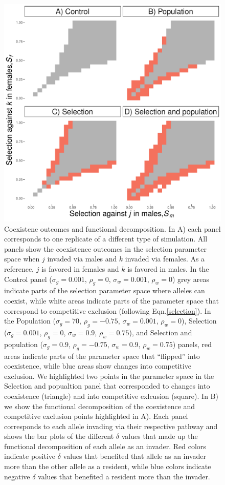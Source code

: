 \begin{figure}[H]
  \centerline{\includegraphics[width=1\textwidth]{outcomes.pdf}}
  \caption{  Coexistene outcomes and functional decomposition. In A) each panel corresponds to one replicate of a different type of simulation. All panels show the coexistence outcomes in the selection parameter space when $j$ invaded via males and $k$ invaded via females. As a reference, $j$ is favored in females and $k$ is favored in males. In the Control panel ($\sigma_{g}=0.001$, $\rho_{g}=0$, $\sigma_{w}=0.001$, $\rho_{w}=0$) grey areas indicate parts of the selection parameter space where alleles can coexist, while white areas indicate parts of the parameter space that correspond to competitive exclusion (following Eqn.\ref{selection}). In the Population ($\sigma_{g}=70$, $\rho_{g}=-0.75$, $\sigma_{w}=0.001$, $\rho_{w}=0$), Selection ($\sigma_{g}=0.001$, $\rho_{g}=0$, $\sigma_{w}=0.9$, $\rho_{w}=0.75$), and Selection and population ($\sigma_{g}=0.9$, $\rho_{g}=-0.75$, $\sigma_{w}=0.9$, $\rho_{w}=0.75$) panels, red areas indicate parts of the parameter space that ``flipped'' into coexistence, while  blue areas show changes into competitive exclusion. We highlighted two points in the parameter space in the Selection and popualtion panel that corresponded to changes into coexistence (triangle) and into competitive exlcusion (square).
   In B) we show the functional decomposition of the coexistence and competitive exclusion points highlighted in A). Each panel corresponds to each allele invading via their respective pathway and shows the bar plots of the different $\delta$ values that made up the functional decomposition of each allele as an invader. Red colors indicate positive $\delta$ values that benefited that allele as an invader more than the other allele as a resident, while  blue colors indicate negative $\delta$ values that benefited a resident more than the invader. }
    \label{fig:outcomes}
\end{figure}




